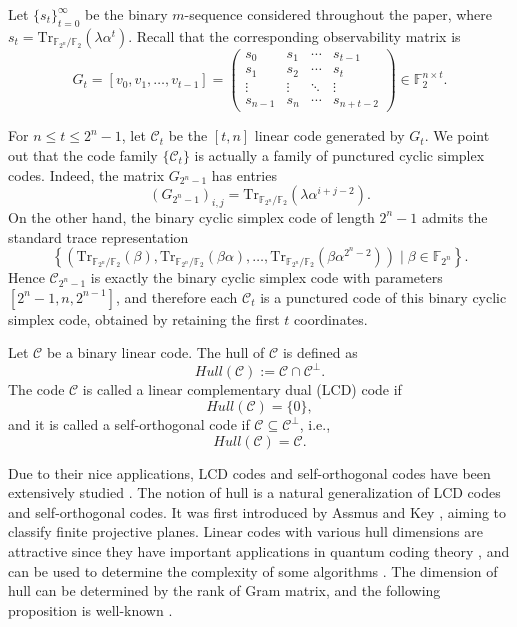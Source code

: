 \documentclass[hidelinks,onefignum,onetabnum]{siamart251216}
\theoremstyle{definition}
\theoremstyle{remark}
\providecommand{\Tr}{{\mathrm{Tr}}}
\providecommand{\F}{{\mathbb{F}}}
\begin{document}
Let $\{s_t\}_{t=0}^\infty$ be the binary $m$-sequence considered throughout the paper, where $s_t=\Tr_{\mathbb F_{2^n}/\mathbb F_2}(\lambda\alpha^t)$. Recall that the corresponding observability matrix is
\[
G_t=[v_0,v_1,\dots,v_{t-1}]
=
\begin{pmatrix}
	s_0 & s_1 & \cdots & s_{t-1}\\
	s_1 & s_2 & \cdots & s_t\\
	\vdots & \vdots & \ddots & \vdots\\
	s_{n-1} & s_n & \cdots & s_{n+t-2}
\end{pmatrix}\in \F_2^{n\times t}.
\]

For $n\le t\le 2^{n}-1$, let $\mathcal{C}_t$ be the $[t,n]$ linear code generated by $G_t$. We point out that the code family $\{\mathcal{C}_t\}$ is actually a family of punctured cyclic simplex codes. Indeed, the matrix $G_{2^{n}-1}$ has entries
\[
(G_{2^{n}-1})_{i,j}=\Tr_{\mathbb F_{2^n}/\mathbb F_2}(\lambda \alpha^{i+j-2}).
\]
On the other hand, the binary cyclic simplex code of length $2^n-1$ admits the standard trace representation
\[
\left\{\left(\Tr_{\mathbb F_{2^n}/\mathbb F_2}(\beta),\Tr_{\mathbb F_{2^n}/\mathbb F_2}(\beta\alpha),\dots,\Tr_{\mathbb F_{2^n}/\mathbb F_2}(\beta\alpha^{2^n-2})\right)\mid \beta\in\mathbb F_{2^n}\right\}.
\]
Hence $\mathcal{C}_{2^n-1}$ is exactly the binary cyclic simplex code with parameters $[2^n-1,n,2^{n-1}]$, and therefore each $\mathcal{C}_t$ is a punctured code of this binary cyclic simplex code, obtained by retaining the first $t$ coordinates.

\begin{definition}
	Let $\mathcal{C}$ be a binary linear code. The hull of $\mathcal{C}$ is defined as
	\[
	\textit{Hull}(\mathcal{C}):=\mathcal{C}\cap \mathcal{C}^\perp.
	\]
	The code $\mathcal{C}$ is called a linear complementary dual (LCD) code if
	\[
	\textit{Hull}(\mathcal{C})=\{0\},
	\]
and it is called a self-orthogonal code if $\mathcal{C}\subseteq  \mathcal{C}^\perp$, i.e.,	\[
\textit{Hull}(\mathcal{C})=\mathcal{C}.
\]
\end{definition}

Due to their nice applications, LCD codes and self-orthogonal codes have been extensively studied \cite{LiC 2017,LiC 2025,Li 2023,Li 2024}. The notion of hull is a natural generalization of LCD codes and self-orthogonal codes. It was first introduced by Assmus and Key \cite{Assmus 1990}, aiming to classify finite projective planes. Linear codes with various hull dimensions are attractive since they have important applications in quantum coding theory \cite{Li 2024,Guenda 2018}, and can be used to determine the complexity of some algorithms \cite{Sendrier 2000,Sendrier 2001}. The dimension of hull can be determined by the rank of Gram matrix, and the following proposition is well-known \cite{Ding 2015}. 
\end{document}
